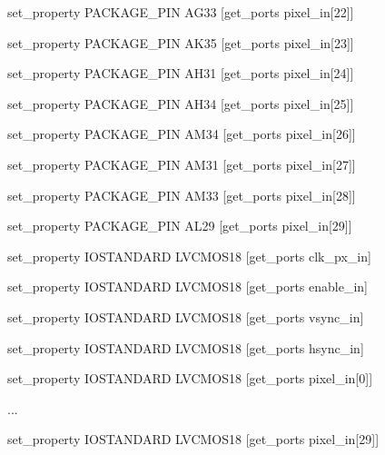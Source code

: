 {set\_property PACKAGE\_PIN AG33 [get\_ports {pixel\_in[22]}]

set\_property PACKAGE\_PIN AK35 [get\_ports {pixel\_in[23]}]

set\_property PACKAGE\_PIN AH31 [get\_ports {pixel\_in[24]}]

set\_property PACKAGE\_PIN AH34 [get\_ports {pixel\_in[25]}]

set\_property PACKAGE\_PIN AM34 [get\_ports {pixel\_in[26]}]

set\_property PACKAGE\_PIN AM31 [get\_ports {pixel\_in[27]}]

set\_property PACKAGE\_PIN AM33 [get\_ports {pixel\_in[28]}]

set\_property PACKAGE\_PIN AL29 [get\_ports {pixel\_in[29]}]


set\_property IOSTANDARD LVCMOS18 [get\_ports clk\_px\_in]

set\_property IOSTANDARD LVCMOS18 [get\_ports enable\_in]

set\_property IOSTANDARD LVCMOS18 [get\_ports vsync\_in]

set\_property IOSTANDARD LVCMOS18 [get\_ports hsync\_in]

set\_property IOSTANDARD LVCMOS18 [get\_ports {pixel\_in[0]}]

...

set\_property IOSTANDARD LVCMOS18 [get\_ports {pixel\_in[29]}]

}
